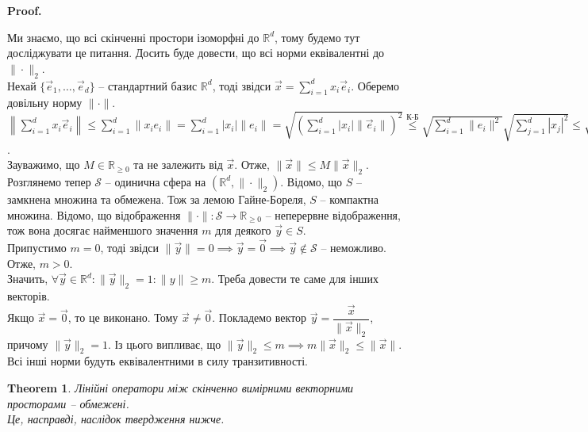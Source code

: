 \documentclass[a4paper, 10pt]{article}
\makeatletter
\theoremstyle{theoremdd}
\newtheorem{theorem}{Theorem}[subsection]
\renewenvironment{proof}[1][Proof.\\]{\par
\pushQED{\hfill \qed}%
\normalfont \topsep6\p@\@plus6\p@\relax
\trivlist
\item\relax
{\bfseries
#1\@addpunct{.}}\hspace\labelsep\ignorespaces
}{%
\popQED\endtrivlist\@endpefalse
}
\makeatother
\begin{document}
\begin{proof}
Ми знаємо, що всі скінченні простори ізоморфні до $\mathbb{R}^d$, тому будемо тут досліджувати це питання. Досить буде довести, що всі норми еквівалентні до $\| \cdot \|_2$.\\
Нехай $\{\vec{e}_1,\dots,\vec{e}_d\}$ -- стандартний базис $\mathbb{R}^d$, тоді звідси $\vec{x} = \displaystyle\sum_{i=1}^d x_i \vec{e}_i$. Оберемо довільну норму $\|\cdot \|$.\\
$\displaystyle\left\| \sum_{i=1}^d x_i \vec{e}_i
 \right\| \leq \sum_{i=1}^d \| x_i e_i \| = \sum_{i=1}^d |x_i| \|e_i\| = \sqrt{\left( \sum_{i=1}^d |x_i| \|\vec{e}_i\| \right)^2} \overset{\text{К-Б}}{\leq} \sqrt{\sum_{i=1}^d \|e_i\|^2} \sqrt{\sum_{j=1}^d |x_j|^2} \leq \sqrt{\sum_{i=1}^d \|e_i\|^2} \sqrt{\sum_{j=1}^\infty |x_j|^2} = \sqrt{\sum_{i=1}^d \|e_i\|^2} \|\vec{x}\|_2 = M \|\vec{x}\|_2$.\\
Зауважимо, що $M \in \mathbb{R}_{\geq 0}$ та не залежить від $\vec{x}$. Отже, $\|\vec{x}\| \leq M \|\vec{x}\|_2$.
\bigskip \\
Розглянемо тепер $\mathcal{S}$ -- одинична сфера на $(\mathbb{R}^d, \|\cdot \|_2)$. Відомо, що $S$ -- замкнена множина та обмежена. Тож за лемою Гайне-Бореля, $S$ -- компактна множина. Відомо, що відображення $\| \cdot \| \colon \mathcal{S} \to \mathbb{R}_{\geq 0}$ -- неперервне відображення, тож вона досягає найменшого значення $m$ для деякого $\vec{y} \in S$.\\
Припустимо $m = 0$, тоді звідси $\|\vec{y}\| = 0 \implies \vec{y} = \vec{0} \implies \vec{y} \notin \mathcal{S}$ -- неможливо. Отже, $m > 0$.\\
Значить, $\forall \vec{y} \in \mathbb{R}^d: \|\vec{y}\|_2 = 1: \|y\| \geq m$. Треба довести те саме для інших векторів.\\
Якщо $\vec{x} = \vec{0}$, то це виконано. Тому $\vec{x} \neq \vec{0}$. Покладемо вектор $\vec{y} = \dfrac{\vec{x}}{\| \vec{x} \|_2}$, причому $\|\vec{y}\|_2 = 1$. Із цього випливає, що $\| \vec{y} \|_2 \leq m \implies m \|\vec{x}\|_2 \leq \|\vec{x}\|$.
\bigskip \\
Всі інші норми будуть еквівалентними в силу транзитивності.
\end{proof}

\begin{theorem}
Лінійні оператори між скінченно вимірними векторними просторами -- обмежені.\\
\textit{Це, насправді, наслідок твердження нижче.}
\end{theorem}
\end{document}
